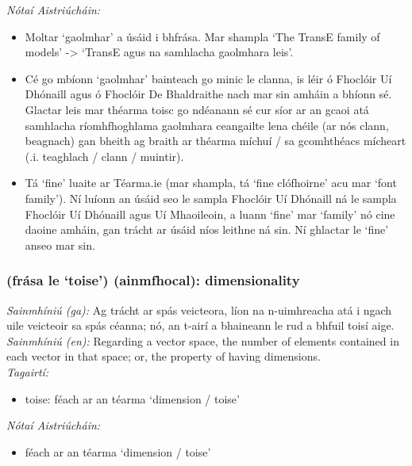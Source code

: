 \documentclass{article}
\begin{document}
 \noindent \textit{Nótaí Aistriúcháin:}
\begin{itemize}
	\item Moltar `gaolmhar' a úsáid i bhfrása. Mar shampla `The TransE family of models' -> `TransE agus na samhlacha gaolmhara leis'.
	\item Cé go mbíonn `gaolmhar' bainteach go minic le clanna, is léir ó Fhoclóir Uí Dhónaill agus ó Fhoclóir De Bhaldraithe nach mar sin amháin a bhíonn sé. Glactar leis mar théarma toisc go ndéanann sé cur síor ar an gcaoi atá samhlacha ríomhfhoghlama gaolmhara ceangailte lena chéile (ar nós clann, beagnach) gan bheith ag braith ar théarma míchuí / sa gcomhthéacs mícheart (.i. teaghlach / clann / muintir).
	\item Tá `fine' luaite ar Téarma.ie (mar shampla, tá `fine clófhoirne' acu mar `font family'). Ní luíonn an úsáid seo le sampla Fhoclóir Uí Dhónaill ná le sampla Fhoclóir Uí Dhónaill agus Uí Mhaoileoin, a luann `fine' mar `family' nó cine daoine amháin, gan trácht ar úsáid níos leithne ná sin. Ní ghlactar le `fine' anseo mar sin.
\end{itemize}


\subsubsection*{(frása le `toise') (ainmfhocal): dimensionality}
 \noindent \textit{Sainmhíniú (ga):} Ag trácht ar spás veicteora, líon na n-uimhreacha atá i ngach uile veicteoir sa spás céanna; nó, an t-airí a bhaineann le rud a bhfuil toisí aige.
\\
 \noindent \textit{Sainmhíniú (en):} Regarding a vector space, the number of elements contained in each vector in that space; or, the property of having dimensions.
\\
 \noindent \textit{Tagairtí:}
\begin{itemize}
	\item toise: féach ar an téarma `dimension / toise'
\end{itemize}

 \noindent \textit{Nótaí Aistriúcháin:}
\begin{itemize}
	\item féach ar an téarma `dimension / toise'
\end{itemize}
\end{document}
